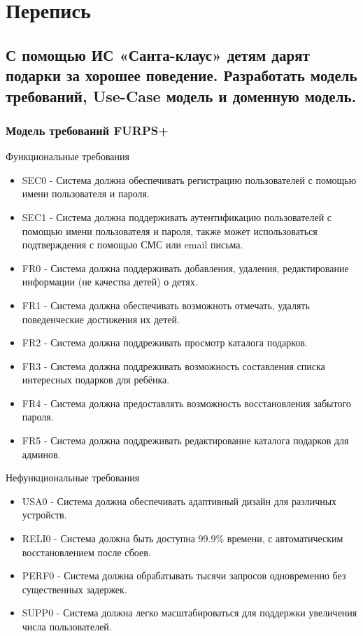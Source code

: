 \documentclass{article}
\begin{document}
\tableofcontents
\newpage

\section[Перепись]{Перепись}
\subsection[Санта-клаус]{С помощью ИС «Санта-клаус» детям дарят подарки за хорошее поведение. Разработать модель требований, Use-Case модель и доменную модель.}
\subsubsection{Модель требований FURPS+}
Функциональные требования
\begin{itemize}
    \item SEC0 - Система должна обеспечивать регистрацию пользователей с помощью имени пользователя и пароля.
    \item SEC1 - Система должна поддерживать аутентификацию пользователей с помощью имени пользователя и пароля, также может использоваться подтверждения с помощью СМС или email письма.
    \item FR0 - Система должна поддерживать добавления, удаления, редактирование информации (не качества детей) о детях.
    \item FR1 - Система должна обеспечивать возможноть отмечать, удалять поведенческие достижения их детей.
    \item FR2 - Система должна поддреживать просмотр каталога подарков.
    \item FR3 - Система должна поддреживать возможность составления списка интересных подарков для ребёнка.
    \item FR4 - Система должна предоставлять возможность восстановления забытого пароля.
    \item FR5 - Система должна поддреживать редактирование каталога подарков для админов.
\end{itemize}
Нефункциональные требования
\begin{itemize}
    \item USA0 - Система должна обеспечивать адаптивный дизайн для различных устройств.
    \item RELI0 - Система должна быть доступна 99.9\% времени, с автоматическим восстановлением после сбоев.
    \item PERF0 - Система должна обрабатывать тысячи запросов одновременно без существенных задержек.
    \item SUPP0 - Система должна легко масштабироваться для поддержки увеличения числа пользователей.
\end{itemize}
\end{document}
